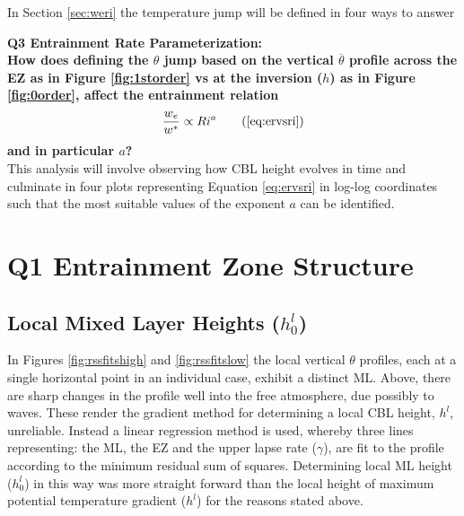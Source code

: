 In Section \ref{sec:weri} the temperature jump will be defined in four ways to answer 

\textbf{Q3 Entrainment Rate Parameterization:}\\
 
\textbf{How does defining the $\theta$ jump based on the vertical $\overline{\theta}$ profile across the \acs{EZ} as in Figure \ref{fig:1storder} vs at the inversion ($h$) as in Figure \ref{fig:0order}, affect the entrainment relation}
 \begin{equation}
\frac{w_{e}}{w^{*}} \propto Ri^{a} \tag{\ref{eq:ervsri}}
\end{equation}
\textbf{and in particular $a$?}\\

This analysis will involve observing how \acs{CBL} height evolves in time and culminate in four plots representing Equation \ref{eq:ervsri} in log-log coordinates such that the most suitable values of the exponent $a$ can be identified. 
\\ 

\clearpage

\section{Q1 Entrainment Zone Structure}
\label{sec:q1}

\subsection{Local Mixed Layer Heights ($h_{0}^{l}$)}
\label{subsec:locmlh}     
\FloatBarrier

In Figures \ref{fig:rssfitshigh} and \ref{fig:rssfitslow} the local vertical $\theta$ profiles,  each at a single horizontal point in an individual case, exhibit a distinct \acs{ML}.  Above, there are sharp changes in the profile well into the free 
atmosphere, due possibly to waves.  These render the gradient method for determining a local \acs{CBL} height, $h^{l}$, 
unreliable.  Instead a linear regression method is used, whereby three lines representing: the
 \acs{ML}, the \acs{EZ} and the upper lapse rate ($\gamma$), are fit to the profile according 
to the minimum residual sum of squares.  Determining local \acs{ML} height ($h_{0}^{l}$) in this way was 
more straight forward than the local height of maximum potential temperature gradient 
($h^{l}$) for the reasons stated above.\\  


